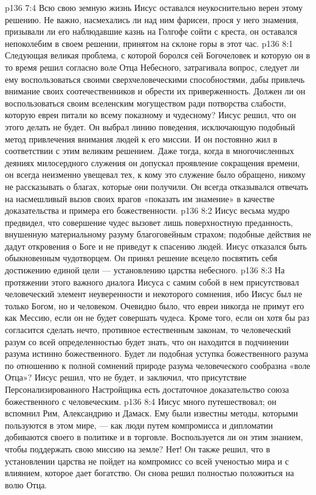 \vs p136 7:4 Всю свою земную жизнь Иисус оставался неукоснительно верен этому решению. Не важно, насмехались ли над ним фарисеи, прося у него знамения, призывали ли его наблюдавшие казнь на Голгофе сойти с креста, он оставался непоколебим в своем решении, принятом на склоне горы в этот час.
\vs p136 8:1 Следующая великая проблема, с которой боролся сей Богочеловек и которую он в то время решил согласно воле Отца Небесного, затрагивала вопрос, следует ли ему воспользоваться своими сверхчеловеческими способностями, дабы привлечь внимание своих соотечественников и обрести их приверженность. Должен ли он воспользоваться своим вселенским могуществом ради потворства слабости, которую евреи питали ко всему показному и чудесному? Иисус решил, что он этого делать не будет. Он выбрал линию поведения, исключающую подобный метод привлечения внимания людей к его миссии. И он постоянно жил в соответствии с этим великим решением. Даже тогда, когда в многочисленных деяниях милосердного служения он допускал проявление сокращения времени, он всегда неизменно увещевал тех, к кому это служение было обращено, никому не рассказывать о благах, которые они получили. Он всегда отказывался отвечать на насмешливый вызов своих врагов «показать им знамение» в качестве доказательства и примера его божественности.
\vs p136 8:2 Иисус весьма мудро предвидел, что совершение чудес вызовет лишь поверхностную преданность, внушенную материальному разуму благоговейным страхом; подобные действия не дадут откровения о Боге и не приведут к спасению людей. Иисус отказался быть обыкновенным чудотворцем. Он принял решение всецело посвятить себя достижению единой цели --- установлению царства небесного.
\vs p136 8:3 \pc На протяжении этого важного диалога Иисуса с самим собой в нем присутствовал человеческий элемент неуверенности и некоторого сомнения, ибо Иисус был не только Богом, но и человеком. Очевидно было, что евреи никогда не примут его как Мессию, если он не будет совершать чудеса. Кроме того, если он хотя бы раз согласится сделать нечто, противное естественным законам, то человеческий разум со всей определенностью будет знать, что он находится в подчинении разума истинно божественного. Будет ли подобная уступка божественного разума по отношению к полной сомнений природе разума человеческого сообразна «воле Отца»? Иисус решил, что не будет, и заключил, что присутствие Персонализированного Настройщика есть достаточное доказательство союза божественного с человеческим.
\vs p136 8:4 \pc Иисус много путешествовал; он вспомнил Рим, Александрию и Дамаск. Ему были известны методы, которыми пользуются в этом мире, --- как люди путем компромисса и дипломатии добиваются своего в политике и в торговле. Воспользуется ли он этим знанием, чтобы поддержать свою миссию на земле? Нет! Он также решил, что в установлении царства не пойдет на компромисс со всей ученостью мира и с влиянием, которое дает богатство. Он снова решил полностью положиться на волю Отца.
